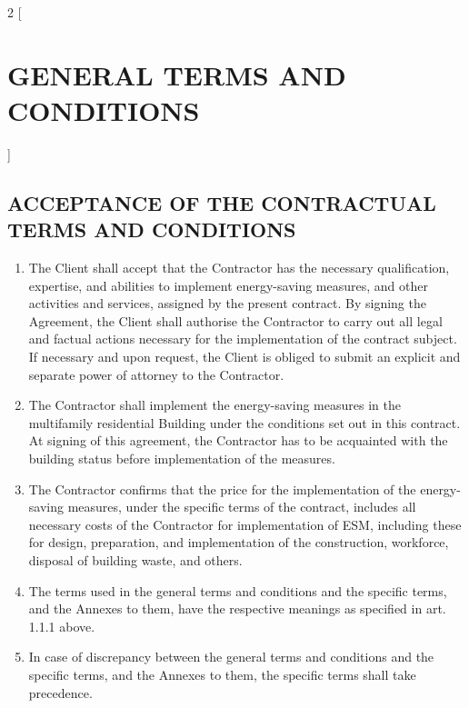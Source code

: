\begin{multicols}{2} [\section{GENERAL TERMS AND CONDITIONS}]
  \subsection{ACCEPTANCE OF THE CONTRACTUAL TERMS AND CONDITIONS}
  \begin{enumerate}
  \item The Client shall accept that the Contractor has the necessary
    qualification, expertise, and abilities to implement energy-saving
    measures, and other activities and services, assigned by the
    present contract. By signing the Agreement, the Client shall
    authorise the Contractor to carry out all legal and factual
    actions necessary for the implementation of the contract
    subject. If necessary and upon request, the Client is obliged to
    submit an explicit and separate power of attorney to the
    Contractor.
  \item The Contractor shall implement the energy-saving measures in
    the multifamily residential Building under the conditions set out
    in this contract. At signing of this agreement, the Contractor has
    to be acquainted with the building status before implementation of
    the measures.
  \item The Contractor confirms that the price for the implementation
    of the energy-saving measures, under the specific terms of the
    contract, includes all necessary costs of the Contractor for
    implementation of ESM, including these for design, preparation,
    and implementation of the construction, workforce, disposal of
    building waste, and others.
  \item The terms used in the general terms and conditions and the
    specific terms, and the Annexes to them, have the respective
    meanings as specified in art. 1.1.1 above.
  \item In case of discrepancy between the general terms and
    conditions and the specific terms, and the Annexes to them, the
    specific terms shall take precedence.
  \end{enumerate}


\end{multicols}

